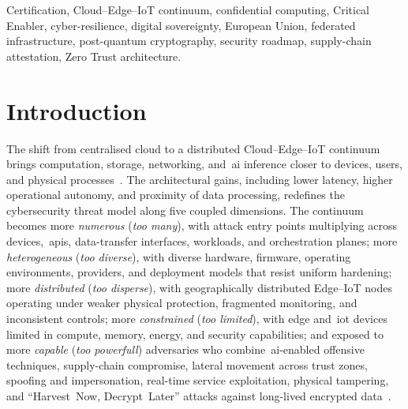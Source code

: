 \documentclass{ieeeaccess}
\begin{document}
\begin{keywords}
Certification, Cloud--Edge--IoT continuum, confidential computing, Critical Enabler, cyber-resilience, digital sovereignty, European Union, federated infrastructure, post-quantum cryptography, security roadmap, supply-chain attestation, Zero Trust architecture.
\end{keywords}

\titlepgskip=-15pt
\maketitle

\section{Introduction}
\label{sec:intro}

The shift from centralised cloud to a distributed Cloud--Edge--IoT continuum brings computation, storage, networking, and~\gls{ai} inference closer to devices, users, and physical processes~\cite{dustdar2023,bittencourt2018,ecroadmap2024}. The architectural gains, including lower latency, higher operational autonomy, and proximity of data processing, redefines the cybersecurity threat model along five coupled dimensions. The continuum becomes more \emph{numerous} (\emph{too many}), with attack entry points multiplying across devices,~\glspl{api}, data-transfer interfaces, workloads, and orchestration planes; more \emph{heterogeneous} (\emph{too diverse}), with diverse hardware, firmware, operating environments, providers, and deployment models that resist uniform hardening; more \emph{distributed} (\emph{too disperse}), with geographically distributed Edge--IoT nodes operating under weaker physical protection, fragmented monitoring, and inconsistent controls; more \emph{constrained} (\emph{too limited}), with edge and~\gls{iot} devices limited in compute, memory, energy, and security capabilities; and exposed to more \emph{capable} (\emph{too powerfull}) adversaries who combine~\gls{ai}-enabled offensive techniques, supply-chain compromise, lateral movement across trust zones, spoofing and impersonation, real-time service exploitation, physical tampering, and ``Harvest~Now, Decrypt~Later'' attacks against long-lived encrypted data~\cite{rose2020zta,chandramouli2023zta,alwarafy2021,roman2018,ranaweera2021}.
\end{document}
